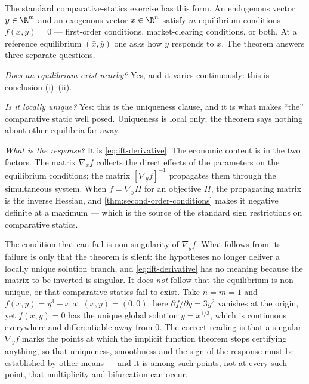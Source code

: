 \begin{remark}
	\label{rem:comparative-statics-ift}
	The standard comparative-statics exercise has this form. An endogenous vector
	$y\in\R^m$ and an exogenous vector $x\in\R^n$ satisfy $m$ equilibrium conditions
	$f(x,y)=0$ --- first-order conditions, market-clearing conditions, or both. At a
	reference equilibrium $(\bar x,\bar y)$ one asks how $y$ responds to $x$. The
	theorem answers three separate questions.

	\emph{Does an equilibrium exist nearby?} Yes, and it varies continuously: this is
	conclusion (i)--(ii).

	\emph{Is it locally unique?} Yes: this is the uniqueness clause, and it is what
	makes ``the'' comparative static well posed. Uniqueness is local only; the
	theorem says nothing about other equilibria far away.

	\emph{What is the response?} It is \eqref{eq:ift-derivative}. The economic
	content is in the two factors. The matrix $\nabla_xf$ collects the direct
	effects of the parameters on the equilibrium conditions; the matrix
	$[\nabla_yf]^{-1}$ propagates them through the simultaneous system. When
	$f=\nabla_y\Pi$ for an objective $\Pi$, the propagating matrix is the inverse
	Hessian, and \autoref{thm:second-order-conditions} makes it negative definite at
	a maximum --- which is the source of the standard sign restrictions on
	comparative statics.

	The condition that can fail is non-singularity of $\nabla_yf$. What follows from
	its failure is only that the theorem is silent: the hypotheses no longer
	deliver a locally unique solution branch, and \eqref{eq:ift-derivative} has no
	meaning because the matrix to be inverted is singular. It does \emph{not}
	follow that the equilibrium is non-unique, or that comparative statics fail to
	exist. Take $n=m=1$ and $f(x,y)=y^3-x$ at $(\bar x,\bar y)=(0,0)$: here
	$\partial f/\partial y=3y^2$ vanishes at the origin, yet $f(x,y)=0$ has the
	unique global solution $y=x^{1/3}$, which is continuous everywhere and
	differentiable away from $0$. The correct reading is that a singular
	$\nabla_yf$ marks the points at which the implicit function theorem stops
	certifying anything, so that uniqueness, smoothness and the sign of the
	response must be established by other means --- and it is among such points,
	not at every such point, that multiplicity and bifurcation can occur.
\end{remark}

